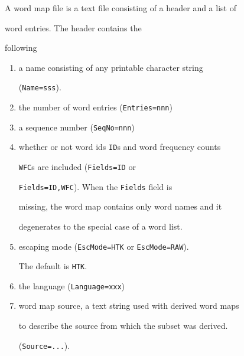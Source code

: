 A word map file is a text file consisting of a header and a list of


word entries.  The header contains the


following


\begin{enumerate}





\item a name consisting of any printable character string 


      (\texttt{Name=sss}).





\item the number of word entries (\texttt{Entries=nnn})





\item a sequence number (\texttt{SeqNo=nnn})





\item whether or not word ids \texttt{ID}s and word frequency counts 


      \texttt{WFC}s are included (\texttt{Fields=ID} or


      \texttt{Fields=ID,WFC}).  When the \texttt{Fields} field is


      missing, the word map contains only word names and it


      degenerates to the special case of a word list.





\item escaping mode (\texttt{EscMode=HTK} or \texttt{EscMode=RAW}). 


      The default is \texttt{HTK}.





\item the language (\texttt{Language=xxx})





\item word map source, a text string used with derived word maps


      to describe the source from which the subset was derived.


      (\texttt{Source=...}).





\end{enumerate}


